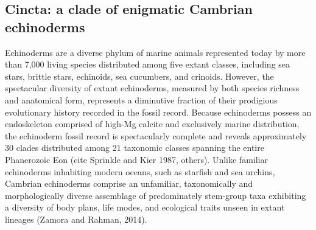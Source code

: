 \documentclass{article}
\begin{document}
\subsection{Cincta: a clade of enigmatic Cambrian echinoderms}
Echinoderms are a diverse phylum of marine animals represented today by more than 7,000 living species \citep{brusca2003} distributed among five extant classes, including sea stars, brittle stars, echinoids, sea cucumbers, and crinoids. However, the spectacular diversity of extant echinoderms, measured by both species richness and anatomical form, represents a diminutive fraction of their prodigious evolutionary history recorded in the fossil record. Because echinoderms possess an endoskeleton comprised of high-Mg calcite and exclusively marine distribution, the echinoderm fossil record is spectacularly complete and reveals approximately 30 clades distributed among 21 taxonomic classes spanning the entire Phanerozoic Eon (cite Sprinkle and Kier 1987, others). Unlike familiar echinoderms inhabiting modern oceans, such as starfish and sea urchins, Cambrian echinoderms comprise an unfamiliar, taxonomically and morphologically diverse assemblage of predominately stem-group taxa exhibiting a diversity of body plans, life modes, and ecological traits unseen in extant lineages (Zamora and Rahman, 2014). 
\end{document}
